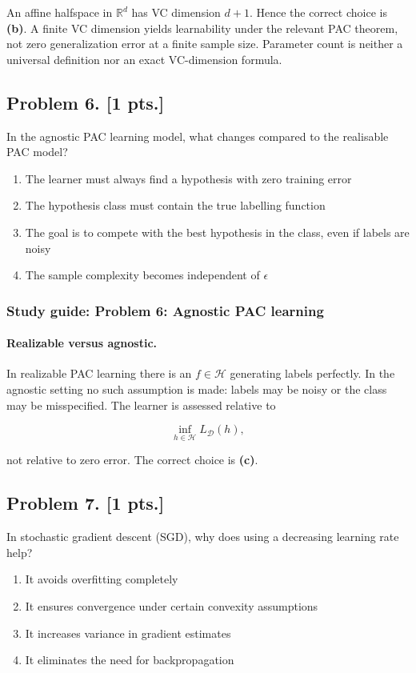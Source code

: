 \documentclass[11pt,a4paper]{article}
\begin{document}
An affine halfspace in $\mathbb{R}^d$ has VC dimension $d+1$. Hence the correct choice is \textbf{(b)}. A finite VC dimension yields learnability under the relevant PAC theorem, not zero generalization error at a finite sample size. Parameter count is neither a universal definition nor an exact VC-dimension formula.



\subsection{Problem 6. [1 pts.]}
In the agnostic PAC learning model, what changes compared to the realisable PAC model?
\begin{enumerate}[label=(\alph*)]
    \item The learner must always find a hypothesis with zero training error
    \item The hypothesis class must contain the true labelling function
    \item The goal is to compete with the best hypothesis in the class, even if labels are noisy
    \item The sample complexity becomes independent of $\epsilon$
\end{enumerate}


\subsubsection{Study guide: Problem 6: Agnostic PAC learning}

\paragraph{Realizable versus agnostic.}

In realizable PAC learning there is an $f\in\mathcal{H}$ generating labels perfectly. In the agnostic setting no such assumption is made: labels may be noisy or the class may be misspecified. The learner is assessed relative to

\[
\inf_{h\in\mathcal{H}} L_{\mathcal{D}}(h),
\]

not relative to zero error. The correct choice is \textbf{(c)}.



\subsection{Problem 7. [1 pts.]}
In stochastic gradient descent (SGD), why does using a decreasing learning rate help?
\begin{enumerate}[label=(\alph*)]
    \item It avoids overfitting completely
    \item It ensures convergence under certain convexity assumptions
    \item It increases variance in gradient estimates
    \item It eliminates the need for backpropagation
\end{enumerate}
\end{document}
